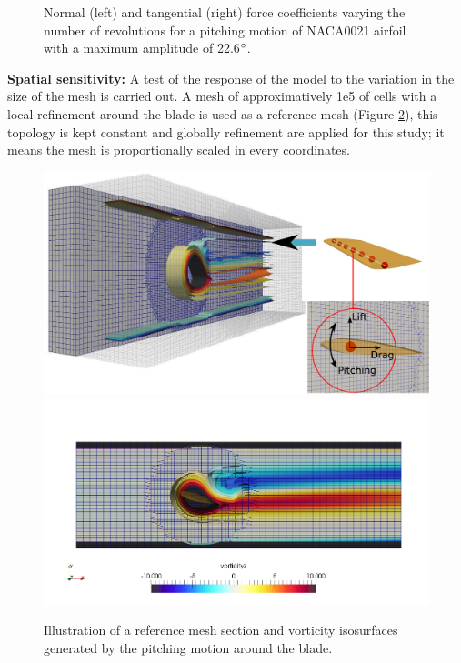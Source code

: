 \documentclass[a4paper]{jpconf}
\begin{document}
\begin{figure}[h]
\begin{minipage}{18pc}
\resizebox{\columnwidth}{!}{}
\end{minipage}\hspace{2pc}%
\begin{minipage}{18pc}
\resizebox{\columnwidth}{!}{}
\end{minipage}
\caption{\label{revolutions}Normal (left) and tangential (right) force coefficients varying the number of revolutions for a pitching motion of NACA0021 airfoil with a maximum amplitude of 22.6$\degree$.}
\end{figure}

\textbf{Spatial sensitivity:} A test of the response of the model
to the variation in the size of the mesh is carried out. A mesh of approximatively 1e5 of cells with a local refinement around the blade is used as a reference mesh (Figure \ref{figrefmesh}), this topology is kept constant and globally refinement are applied for this study; it means the mesh is proportionally scaled in every coordinates.

\begin{figure}[h]
\begin{minipage}{36pc}
\includegraphics[width=0.5\columnwidth]{vorticityZ2.eps}
\includegraphics[width=0.5\columnwidth]{vorticityZ.png}
\end{minipage}%
\caption{\label{figrefmesh} Illustration of a reference mesh section and vorticity isosurfaces generated by the pitching motion around the blade.}
\end{figure}
\end{document}
